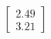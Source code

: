 \documentclass[preview]{standalone}
\begin{document}
\begin{align*}
\begin{bmatrix} 2.49 \\ 3.21 \end{bmatrix}
\end{align*}
\end{document}
